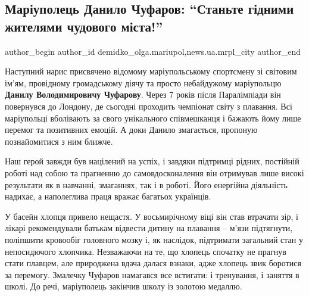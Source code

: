  
 
 
 
 
 
\subsection{Маріуполець Данило Чуфаров: \enquote{Станьте гідними жителями чудового міста!}}
\label{sec:17_09_2019.stz.news.ua.mrpl_city.1.danylo_chufarov}
 
\ifcmt
 author_begin
   author_id demidko_olga.mariupol,news.ua.mrpl_city
 author_end
\fi

Наступний нарис присвячено відомому маріупольському спортсмену зі світовим
ім'ям, провідному громадському діячу та просто небайдужому маріупольцю \textbf{Данилу
Володимировичу Чуфарову}. Через 7 років після Паралімпіади він повернувся до
Лондону, де сьогодні проходить чемпіонат світу з плавання. Всі маріупольці
вболівають за свого унікального співмешканця і бажають йому лише перемог та
позитивних емоцій. А доки Данило змагається, пропоную познайомитися з ним
ближче.


Наш герой завжди був націлений на успіх, і завдяки підтримці рідних, постійній
роботі над собою та прагненню до самовдосконалення він отримував лише високі
результати як в навчанні, змаганнях, так і в роботі. Його енергійна діяльність
надихає, а наполеглива праця вражає багатьох українців.

У басейн хлопця привело нещастя. У восьмирічному віці він став втрачати зір, і
лікарі рекомендували батькам відвести дитину на плавання – м'язи підтягнути,
поліпшити кровообіг головного мозку і, як наслідок, підтримати загальний стан у
непосидючого хлопчика. Незважаючи на те, що хлопець спочатку не прагнув стати
плавцем, але природжена вдача далася взнаки, адже хлопець звик боротися за
перемогу. Змалечку Чуфаров намагався все встигати: і тренування, і заняття в
школі. До речі, маріуполець закінчив школу із золотою медаллю.

